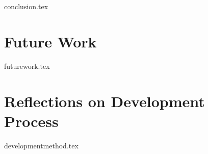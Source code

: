 {conclusion.tex}
\chapter{Future Work}
{futurework.tex}
\chapter{Reflections on Development Process}
{developmentmethod.tex}
